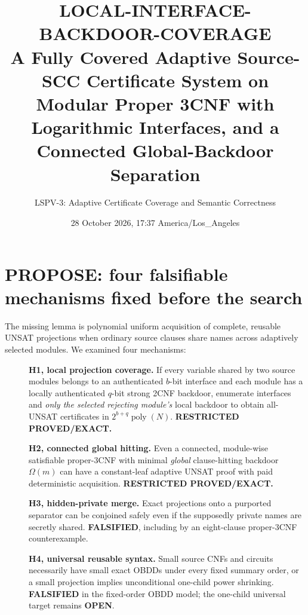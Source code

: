 \documentclass[11pt]{article}
\title{LOCAL-INTERFACE-BACKDOOR-COVERAGE\\\large A Fully Covered Adaptive Source-SCC Certificate System on Modular Proper 3CNF with Logarithmic Interfaces, and a Connected Global-Backdoor Separation}
\author{LSPV-3: Adaptive Certificate Coverage and Semantic Correctness}
\date{28 October 2026, 17:37 America/Los\_Angeles}
\begin{document}
\maketitle
\begin{center}
\end{center}

\section{PROPOSE: four falsifiable mechanisms fixed before the search}
The missing lemma is polynomial uniform acquisition of complete, reusable UNSAT projections when ordinary source clauses share names across adaptively selected modules. We examined four mechanisms:
\begin{description}
\item[] \textbf{H1, local projection coverage.} If every variable shared by two source modules belongs to an authenticated $b$-bit interface and each module has a locally authenticated $q$-bit strong 2CNF backdoor, enumerate interfaces and \emph{only the selected rejecting module's} local backdoor to obtain all-UNSAT certificates in $2^{b+q}\operatorname{poly}(N)$. \textbf{RESTRICTED PROVED/EXACT.}
\item[] \textbf{H2, connected global hitting.} Even a connected, module-wise satisfiable proper-3CNF with minimal \emph{global} clause-hitting backdoor $\Omega(m)$ can have a constant-leaf adaptive UNSAT proof with paid deterministic acquisition. \textbf{RESTRICTED PROVED/EXACT.}
\item[] \textbf{H3, hidden-private merge.} Exact projections onto a purported separator can be conjoined safely even if the supposedly private names are secretly shared. \textbf{FALSIFIED}, including by an eight-clause proper-3CNF counterexample.
\item[] \textbf{H4, universal reusable syntax.} Small source CNFs and circuits necessarily have small exact OBDDs under every fixed summary order, or a small projection implies unconditional one-child power shrinking. \textbf{FALSIFIED} in the fixed-order OBDD model; the one-child universal target remains \textbf{OPEN}.
\end{description}
\end{document}
